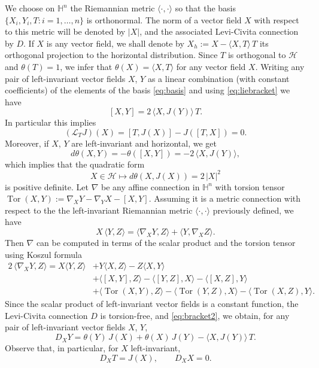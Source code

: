 \documentclass[10pt]{amsart}
\theoremstyle{definition}
\theoremstyle{remark}
\numberwithin{equation}{section}
\begin{document}
We choose on ${{\mathbb{H}}}^n$ the Riemannian metric ${\langle{\cdot,\cdot}\rangle}$  so that the basis $\{X_{i}, Y_{i}, T: i=1,\ldots,n\}$ is orthonormal. The norm of a vector field $X$ with respect to this metric will be denoted by $|X|$, and the associated Levi-Civita connection by $D$. If $X$ is any vector field, we shall denote by $X_h:=X-{\langle{X,T}\rangle}\,T$ its orthogonal projection to the horizontal distribution. Since $T$ is orthogonal to ${\mathcal{H}}$ and $\theta(T)=1$, we infer that $\theta(X)={\langle{X,T}\rangle}$ for any vector field $X$. Writing any pair of left-invariant vector fields $X$, $Y$ as a linear combination (with constant coefficients) of the elements of the basis \eqref{eq:basis} and using \eqref{eq:liebracket} we have
\begin{equation}
\label{eq:bracket2}
[X,Y]=2\,{\langle{X,J(Y)}\rangle}\,T.
\end{equation}
In particular this implies
\[
({\mathcal{L}}_{T}J)(X)=[T,J(X)]-J([T,X])=0.
\]
Moreover, if $X$, $Y$ are left-invariant and horizontal, we get
\[
d\theta(X,Y)=-\theta([X,Y])=-2\,{\langle{X,J(Y)}\rangle},
\]
which implies that the quadratic form
\[
X\in{\mathcal{H}}\mapsto d\theta(X,J(X))=2\,|X|^2
\]
is positive definite.
Let $\nabla$ be any affine connection in ${{\mathbb{H}}}^n$ with torsion tensor $\operatorname{Tor}(X,Y):=\nabla_XY-\nabla_YX-[X,Y]$. Assuming it is a metric connection with respect to the the left-invariant Riemannian metric ${\langle{\cdot,\cdot}\rangle}$ previously defined, we have
\begin{equation}
\label{eq:metric}
X\,{\langle{Y,Z}\rangle}={\langle{\nabla_XY,Z}\rangle}+{\langle{Y,\nabla_XZ}\rangle}.
\end{equation}
Then $\nabla$ can be computed in terms of the scalar product and the torsion tensor using Koszul formula
\begin{align*}
2\,{\langle{\nabla_XY,Z}\rangle}=X{\langle{Y,Z}\rangle}&+Y{\langle{X,Z}\rangle}-Z{\langle{X,Y}\rangle}
\\
&+{\langle{[X,Y],Z}\rangle}-{\langle{[Y,Z],X}\rangle}-{\langle{[X,Z],Y}\rangle}
\\
&+{\langle{\operatorname{Tor}(X,Y),Z}\rangle}-{\langle{\operatorname{Tor}(Y,Z),X}\rangle}-{\langle{\operatorname{Tor}(X,Z),Y}\rangle}.
\end{align*}
Since the scalar product of left-invariant vector fields is a constant function, the Levi-Civita connection $D$ is torsion-free, and \eqref{eq:bracket2}, we obtain, for any pair of left-invariant vector fields $X$, $Y$,
\begin{equation}
\label{eq:levicivita}
D_XY=\theta(Y)\,J(X)+\theta(X)\,J(Y)-{\langle{X,J(Y)}\rangle}\,T.
\end{equation}
Observe that, in particular, for $X$ left-invariant,
\[
D_XT=J(X),\qquad D_XX=0.
\]
\end{document}
